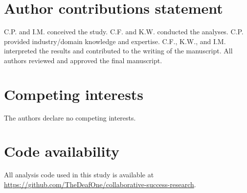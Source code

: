 \documentclass[fleqn,10pt]{wlscirep}
\begin{document}
\section*{Author contributions statement}
C.P. and I.M. conceived the study. C.F. and K.W. conducted the analyses. C.P. provided industry/domain knowledge and expertise. C.F., K.W., and I.M. interpreted the results and contributed to the writing of the manuscript.  All authors reviewed and approved the final manuscript. 

\section*{Competing interests}
The authors declare no competing interests.

\section*{Code availability}
All analysis code used in this study  is available at \\
\url{https://github.com/TheDeafOne/collaborative-success-research}.
\end{document}
